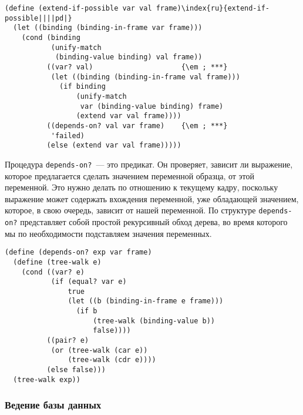 \begin{Verbatim}[fontsize=\small]
(define (extend-if-possible var val frame)\index{ru}{extend-if-possible||||pd|}
  (let ((binding (binding-in-frame var frame)))
    (cond (binding
           (unify-match
            (binding-value binding) val frame))
          ((var? val)                     {\em ; ***}
           (let ((binding (binding-in-frame val frame)))
             (if binding
                 (unify-match
                  var (binding-value binding) frame)
                 (extend var val frame))))
          ((depends-on? val var frame)    {\em ; ***}
           'failed)
          (else (extend var val frame)))))
\end{Verbatim}

Процедура {\tt depends-on?}~--- это предикат. Он
проверяет, зависит ли выражение, которое предлагается сделать
значением переменной образца, от этой переменной.  Это нужно делать по
отношению к текущему кадру, поскольку выражение может содержать
вхождения переменной, уже обладающей значением, которое, в свою
очередь, зависит от нашей переменной.  По структуре
{\tt depends-on?} представляет собой простой рекурсивный обход
дерева, во время которого мы по необходимости подставляем значения
переменных.

\begin{Verbatim}[fontsize=\small]
(define (depends-on? exp var frame)
  (define (tree-walk e)
    (cond ((var? e)
           (if (equal? var e)
               true
               (let ((b (binding-in-frame e frame)))
                 (if b
                     (tree-walk (binding-value b))
                     false))))
          ((pair? e)
           (or (tree-walk (car e))
               (tree-walk (cdr e))))
          (else false)))
  (tree-walk exp))
\end{Verbatim}

\subsubsection{Ведение базы данных}
\label{MAINTAINING-THE-DATA-BASE}%


